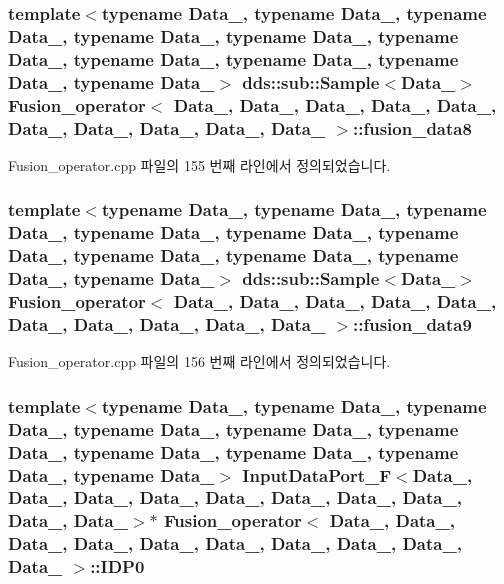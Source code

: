 \subsubsection[{\texorpdfstring{fusion\+\_\+data8}{fusion_data8}}]{\setlength{\rightskip}{0pt plus 5cm}template$<$typename Data\+\_, typename Data\+\_, typename Data\+\_, typename Data\+\_, typename Data\+\_, typename Data\+\_, typename Data\+\_, typename Data\+\_, typename Data\+\_, typename Data\+\_$>$ dds\+::sub\+::\+Sample$<$Data\+\_$>$ {\bf Fusion\+\_\+operator}$<$ Data\+\_, Data\+\_, Data\+\_, Data\+\_, Data\+\_, Data\+\_, Data\+\_, Data\+\_, Data\+\_, Data\+\_ $>$\+::fusion\+\_\+data8}\hypertarget{classFusion__operator_ac3ddeea7acd61121e02501cbffc2b7be}{}\label{classFusion__operator_ac3ddeea7acd61121e02501cbffc2b7be}


Fusion\+\_\+operator.\+cpp 파일의 155 번째 라인에서 정의되었습니다.

\subsubsection[{\texorpdfstring{fusion\+\_\+data9}{fusion_data9}}]{\setlength{\rightskip}{0pt plus 5cm}template$<$typename Data\+\_, typename Data\+\_, typename Data\+\_, typename Data\+\_, typename Data\+\_, typename Data\+\_, typename Data\+\_, typename Data\+\_, typename Data\+\_, typename Data\+\_$>$ dds\+::sub\+::\+Sample$<$Data\+\_$>$ {\bf Fusion\+\_\+operator}$<$ Data\+\_, Data\+\_, Data\+\_, Data\+\_, Data\+\_, Data\+\_, Data\+\_, Data\+\_, Data\+\_, Data\+\_ $>$\+::fusion\+\_\+data9}\hypertarget{classFusion__operator_af352606f5dcf540b5e9beb72870c9fa6}{}\label{classFusion__operator_af352606f5dcf540b5e9beb72870c9fa6}


Fusion\+\_\+operator.\+cpp 파일의 156 번째 라인에서 정의되었습니다.

\subsubsection[{\texorpdfstring{I\+D\+P0}{IDP0}}]{\setlength{\rightskip}{0pt plus 5cm}template$<$typename Data\+\_, typename Data\+\_, typename Data\+\_, typename Data\+\_, typename Data\+\_, typename Data\+\_, typename Data\+\_, typename Data\+\_, typename Data\+\_, typename Data\+\_$>$ {\bf Input\+Data\+Port\+\_\+F}$<$Data\+\_, Data\+\_, Data\+\_, Data\+\_, Data\+\_, Data\+\_, Data\+\_, Data\+\_, Data\+\_, Data\+\_$>$$\ast$ {\bf Fusion\+\_\+operator}$<$ Data\+\_, Data\+\_, Data\+\_, Data\+\_, Data\+\_, Data\+\_, Data\+\_, Data\+\_, Data\+\_, Data\+\_ $>$\+::I\+D\+P0}\hypertarget{classFusion__operator_a7bcb3db4950e0de858fcd1e481e987d9}{}\label{classFusion__operator_a7bcb3db4950e0de858fcd1e481e987d9}


